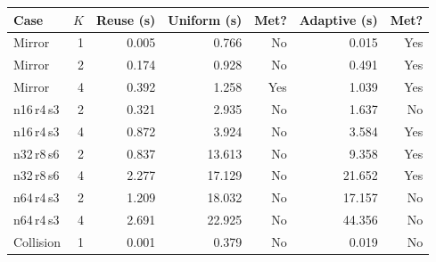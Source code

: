 \begin{tabular}{lrrrrrr}
\toprule
Case & $K$ & Reuse (s) & Uniform (s) & Met? & Adaptive (s) & Met?\\
\midrule
Mirror & 1 & 0.005 & 0.766 & No & 0.015 & Yes\\
Mirror & 2 & 0.174 & 0.928 & No & 0.491 & Yes\\
Mirror & 4 & 0.392 & 1.258 & Yes & 1.039 & Yes\\
n16\,r4\,s3 & 2 & 0.321 & 2.935 & No & 1.637 & No\\
n16\,r4\,s3 & 4 & 0.872 & 3.924 & No & 3.584 & Yes\\
n32\,r8\,s6 & 2 & 0.837 & 13.613 & No & 9.358 & Yes\\
n32\,r8\,s6 & 4 & 2.277 & 17.129 & No & 21.652 & Yes\\
n64\,r4\,s3 & 2 & 1.209 & 18.032 & No & 17.157 & No\\
n64\,r4\,s3 & 4 & 2.691 & 22.925 & No & 44.356 & No\\
Collision & 1 & 0.001 & 0.379 & No & 0.019 & No\\
\bottomrule
\end{tabular}
